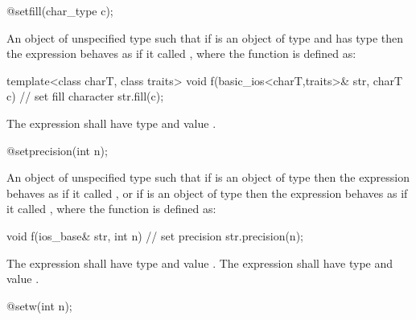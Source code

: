 %
\begin{itemdecl}
@\unspec@ setfill(char_type c);
\end{itemdecl}

\begin{itemdescr}
\pnum
\returns
An object of unspecified type such that if
is an object of type
and  has type
then the expression
behaves as if it called
, where the function  is defined as:

\begin{codeblock}
template<class charT, class traits>
void f(basic_ios<charT,traits>& str, charT c) {
  // set fill character
  str.fill(c);
}
\end{codeblock}

The expression
shall have type
and value
.
\end{itemdescr}

%
\begin{itemdecl}
@\unspec@ setprecision(int n);
\end{itemdecl}

\begin{itemdescr}
\pnum
\returns
An object of unspecified type such that if
is an object of type
then the expression
behaves as if it called
,
or if
is an object of type
then the expression
behaves as if it called
, where the function  is defined as:

\begin{codeblock}
void f(ios_base& str, int n) {
  // set precision
  str.precision(n);
}
\end{codeblock}

The expression
shall have type
and value
.
The expression
shall have type
and value
.
\end{itemdescr}

%
\begin{itemdecl}
@\unspec@ setw(int n);
\end{itemdecl}

